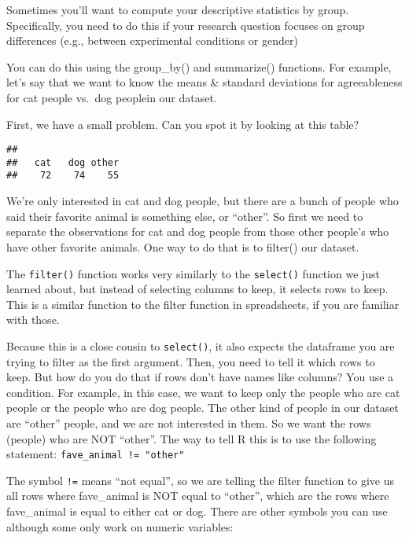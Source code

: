 \documentclass[
]{article}
\newenvironment{Shaded}{\begin{snugshade}}{\end{snugshade}}
\newcommand{\FunctionTok}[1]{\textcolor[rgb]{0.13,0.29,0.53}{\textbf{#1}}}
\newcommand{\NormalTok}[1]{#1}
\newcommand{\SpecialCharTok}[1]{\textcolor[rgb]{0.81,0.36,0.00}{\textbf{#1}}}
\begin{document}
Sometimes you'll want to compute your descriptive statistics by group.
Specifically, you need to do this if your research question focuses on
group differences (e.g., between experimental conditions or gender)

You can do this using the group\_by() and summarize() functions. For
example, let's say that we want to know the means \& standard deviations
for agreeableness for cat people vs.~dog peoplein our dataset.

First, we have a small problem. Can you spot it by looking at this
table?

\begin{Shaded}
\end{Shaded}

\begin{verbatim}
## 
##   cat   dog other 
##    72    74    55
\end{verbatim}

We're only interested in cat and dog people, but there are a bunch of
people who said their favorite animal is something else, or ``other''.
So first we need to separate the observations for cat and dog people
from those other people's who have other favorite animals. One way to do
that is to filter() our dataset.

The \texttt{filter()} function works very similarly to the
\texttt{select()} function we just learned about, but instead of
selecting columns to keep, it selects rows to keep. This is a similar
function to the filter function in spreadsheets, if you are familiar
with those.

Because this is a close cousin to \texttt{select()}, it also expects the
dataframe you are trying to filter as the first argument. Then, you need
to tell it which rows to keep. But how do you do that if rows don't have
names like columns? You use a condition. For example, in this case, we
want to keep only the people who are cat people or the people who are
dog people. The other kind of people in our dataset are ``other''
people, and we are not interested in them. So we want the rows (people)
who are NOT ``other''. The way to tell R this is to use the following
statement: \texttt{fave\_animal\ !=\ "other"}

The symbol \texttt{!=} means ``not equal'', so we are telling the filter
function to give us all rows where fave\_animal is NOT equal to
``other'', which are the rows where fave\_animal is equal to either cat
or dog. There are other symbols you can use although some only work on
numeric variables:
\end{document}
